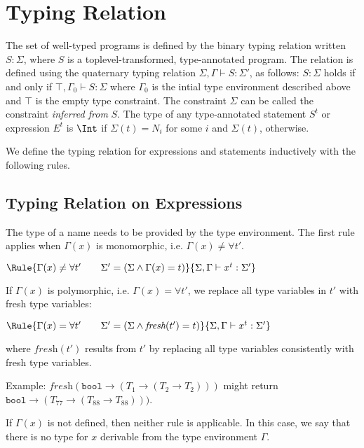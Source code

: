 \section{Typing Relation}

The set of well-typed programs is defined by the binary typing relation
written $S: \Sigma$, where $S$ is a toplevel-transformed, type-annotated program.
The relation is defined using the quaternary typing relation
$\Sigma, \Gamma \vdash S : \Sigma'$, as follows:
$S: \Sigma$ holds if and only if 
$\top, \Gamma_0 \vdash S : \Sigma$
where $\Gamma_0$ is the intial type environment described above and $\top$ is the empty
type constraint. The constraint $\Sigma$ can be called the constraint \emph{inferred from}
$S$. The type of any type-annotated statement $S^t$ or expression $E^t$ is
$\Int$ if $\Sigma(t) = N_i$ for some $i$ and $\Sigma(t)$, otherwise.

We define the typing relation for expressions and statements
inductively with the following rules.

\subsection{Typing Relation on Expressions}

The type of a name needs to be provided by the type environment. The first rule
applies when $\Gamma(x)$ is monomorphic, i.e. $\Gamma(x) \neq \forall t'$.

\noindent
$\Rule{\Gamma(x) \neq \forall t' \qquad
  \Sigma' = (\Sigma \wedge \Gamma(x) = t)}{\Sigma, \Gamma \vdash x^t : \Sigma'}$

If $\Gamma(x)$ is polymorphic,  i.e. $\Gamma(x) = \forall t'$, we replace all type variables in
$t'$ with fresh type variables:

\noindent
$\Rule{\Gamma(x) = \forall t' \qquad
  \Sigma' = (\Sigma \wedge \textit{fresh}(t') = t)}{\Sigma, \Gamma \vdash x^t : \Sigma'}$

\noindent
where $\textit{fresh}(t')$ results from $t'$ by replacing all type variables consistently with
fresh type variables.

Example: $\textit{fresh}(\texttt{bool} \rightarrow (T_1 \rightarrow (T_2 \rightarrow T_2)))$
might return $\texttt{bool} \rightarrow (T_{77} \rightarrow (T_{88} \rightarrow T_{88})))$.

If $\Gamma(x)$ is not defined, then neither rule is applicable.
In this case, we say that
there is no type for $x$ derivable from the type environment $\Gamma$. 

